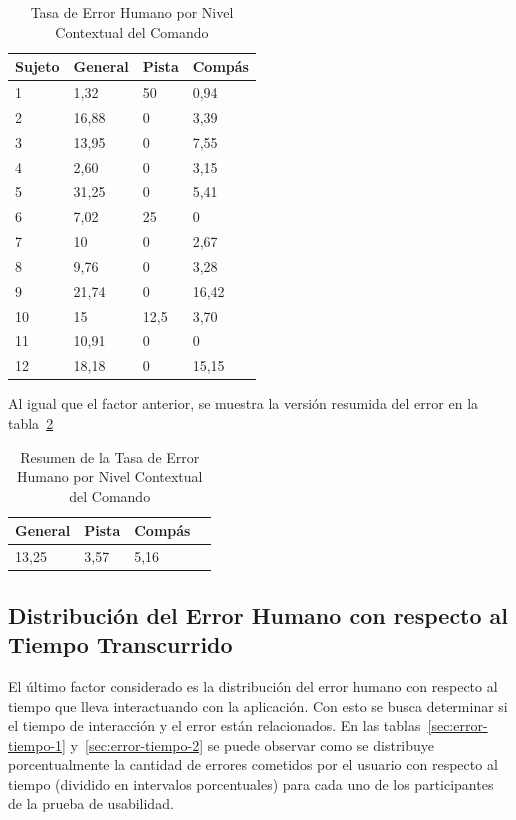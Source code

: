\begin{table}[H]
\centering
\footnotesize
\begin{tabular}{|p{1.6cm}|p{1.6cm}|p{1.6cm}|p{1.6cm}|}
\hline
    Sujeto & General & Pista & Comp\'as \\
    \hline
1 & 1,32  & 50     & 0,94 \\
2 & 16,88 & 0      & 3,39 \\
3 & 13,95 & 0      & 7,55 \\
4 & 2,60 & 0      & 3,15 \\
5 & 31,25 & 0      & 5,41 \\
6 & 7,02 & 25     & 0 \\
7 & 10     & 0      & 2,67 \\
8 & 9,76 & 0      & 3,28 \\
9 & 21,74 & 0      & 16,42 \\
10 & 15     & 12,5 & 3,70 \\
11 & 10,91 & 0      & 0 \\
12 & 18,18 & 0      & 15,15 \\
    \hline
\end{tabular}
\caption{Tasa de Error Humano por Nivel Contextual del Comando}
\label{sec:error-contexto}
\end{table}

Al igual que el factor anterior, se muestra la versi\'on resumida del error en la 
tabla~\ref{sec:error-contexto-resumen}

\begin{table}[H]
\centering
\footnotesize
\begin{tabular}{|p{1.6cm}|p{1.6cm}|p{1.6cm}|p{1.6cm}|}
\hline
    General & Pista & Comp\'as \\
    \hline
    13,25 & 3,57 & 5,16 \\
    \hline
\end{tabular}
\caption{Resumen de la Tasa de Error Humano por Nivel Contextual del Comando}
\label{sec:error-contexto-resumen}
\end{table}

\subsection{Distribuci\'on del Error Humano con respecto al Tiempo Transcurrido}

El \'ultimo factor considerado es la distribuci\'on del error humano con respecto al tiempo 
que lleva interactuando con la aplicaci\'on. Con esto se busca determinar si el tiempo de interacci\'on 
y el error est\'an relacionados. En las tablas~\ref{sec:error-tiempo-1} y~\ref{sec:error-tiempo-2} se puede observar
como se distribuye porcentualmente la cantidad de errores cometidos por el usuario con respecto al tiempo 
(dividido en intervalos porcentuales) para cada uno de los participantes de la prueba de usabilidad.

